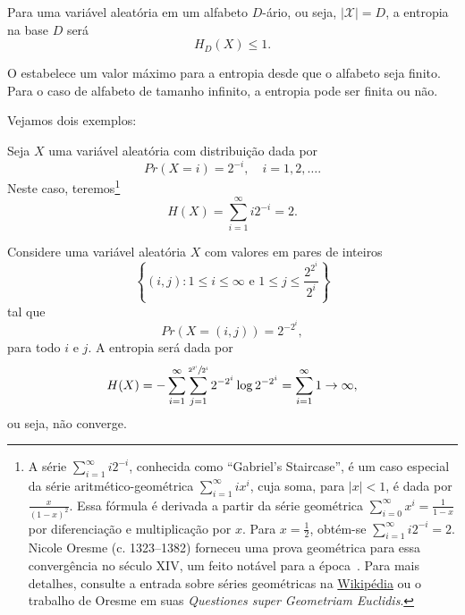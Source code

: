 \begin{remark}
  Para uma variável aleatória em um alfabeto $D$-ário, ou seja, $\vert \mathcal{X} \vert = D$, 
  a entropia na base $D$ será
  \begin{equation}
    H_D (X) \leq 1 .
  \end{equation}
\end{remark}

\begin{remark}
  O  estabelece um valor máximo para a entropia desde que o alfabeto seja finito.
  Para o caso de alfabeto de tamanho infinito, a entropia pode ser finita ou não.
\end{remark}

Vejamos dois exemplos:
\begin{example}
  Seja $X$ uma variável aleatória com distribuição dada por
  \begin{equation}
    Pr(X=i) = 2^{-i}, \quad i=1,2,\ldots .
  \end{equation}
  Neste caso, teremos\footnote{A série $\sum_{i=1}^{\infty} i 2^{-i}$,
     conhecida como ``Gabriel's Staircase'', é um caso especial da série aritmético-geométrica
     $\sum_{i=1}^{\infty} i x^i$, cuja soma, para $|x| < 1$, é dada por $\frac{x}{(1-x)^2}$.
     Essa fórmula é derivada a partir da série geométrica $\sum_{i=0}^{\infty} x^i = \frac{1}{1-x}$ 
     por diferenciação e multiplicação por $x$. Para $x = \frac{1}{2}$, obtém-se $\sum_{i=1}^{\infty} i 2^{-i} = 2$.
     Nicole Oresme (c. 1323--1382) forneceu uma prova geométrica para essa convergência no século XIV,
     um feito notável para a época~\parencite{oresme2003, wiki:geometric_series, edgar2018}. 
     Para mais detalhes, consulte a entrada sobre séries geométricas na \href{https://en.wikipedia.org/wiki/Geometric_series}{Wikipédia} ou o trabalho de
     Oresme em suas \emph{Questiones super Geometriam Euclidis}.}
  \begin{equation}
    H(X) = \sum_{i=1}^{\infty} i 2^{-i} = 2 .
  \end{equation}
\end{example}

\begin{example}
  Considere uma variável aleatória $X$ com valores em pares de inteiros
  \begin{equation}
    \left\{ (i,j) : 1 \leq i \leq \infty \text{ e } 1 \leq j \leq \frac{2^{2^i}}{2^i} \right\}
  \end{equation}
  tal que 
  \begin{equation}
    Pr(X = (i,j)) = 2^{-2^i} ,
  \end{equation}
  para todo $i$ e $j$.
  A entropia será dada por 
  \begin{equation}
    H(X) = - \sum_{i=1}^{\infty} \sum_{j=1}^{\sfrac{2^{2^i}}{2^i}} 2^{-2^i} \log 2^{-2^i} = \sum_{i=1}^{\infty} 1 \rightarrow \infty ,
  \end{equation}
  ou seja, não converge.
\end{example}


